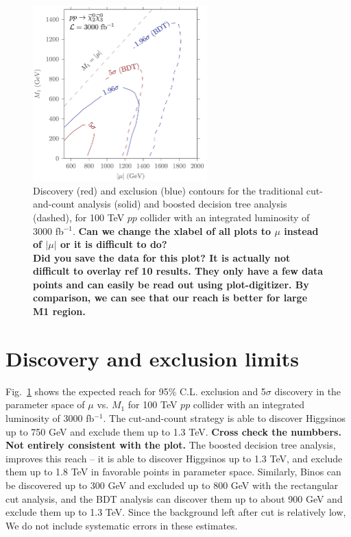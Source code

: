 \documentclass[a4paper,11pt]{article}
\newcommand{\Shufang}[1]{{\bf\color{Maroon}  #1}}
\begin{document}
\begin{figure}[h]
\centering
\includegraphics[width=0.6\textwidth]{images/dm_100_TeV_contours.png}

\caption{ Discovery (red) and exclusion (blue) contours for the traditional
  cut-and-count analysis (solid) and boosted decision tree analysis (dashed),
  for 100 TeV $pp$ collider with an integrated luminosity of 3000 fb$^{-1}$.
\Shufang{Can we change the xlabel of all plots to $\mu$ instead of $|\mu|$ or it is difficult to do?}\\  \Shufang{Did you save the data for this plot?  It is actually not difficult to overlay ref 10 results.  They only have a few data points and can easily be read out using plot-digitizer.  By comparison, we can see that our reach is better for large M1 region.}
}

\label{fig:contours}
\end{figure}

\section{Discovery and exclusion limits}
\label{sec:results}

Fig.~\ref{fig:contours} shows the expected reach  for 95\%
C.L. exclusion and 5$\sigma$ discovery in the parameter space of $\mu$ vs.
$M_1$ for 100 TeV $pp$ collider with an integrated luminosity of 3000
fb$^{-1}$. The cut-and-count strategy is able to discover Higgsinos up to 750
GeV  and exclude them up to 1.3 TeV. \Shufang{Cross check the numbbers. Not entirely consistent with the plot.}    The boosted decision tree analysis, improves this reach -- it
is able to discover Higgsinos up to 1.3 TeV, and exclude them up to 1.8 TeV in
favorable points in parameter space.  Similarly, Binos can be discovered up to
300 GeV and excluded up to 800 GeV with the rectangular cut analysis, and the
BDT analysis can discover them up to about 900 GeV and exclude them up to 1.3
TeV. Since the background left after cut is relatively low, We do not include
systematic errors in these estimates.  
\end{document}
